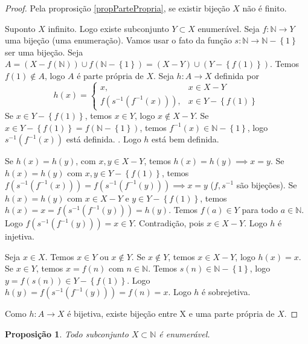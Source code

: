 \documentclass{article}
\theoremstyle{plain}
\newtheorem{prop}{Proposição}[section]
\theoremstyle{definition}
\theoremstyle{remark}
\begin{document}
\begin{proof}
	
	Pela proprosição \ref{propPartePropria}, se existir bijeção $X$ não é finito.

	Suponto $X$ infinito. Logo existe subconjunto $Y\subset X$ enumerável. Seja $f:\mathbb{N} \to Y$ uma bijeção (uma enumeração). Vamos usar o fato da função $s: \mathbb{N} \to \mathbb{N} -\left\{1\right\}$ ser uma bijeção.  Seja $A = \left(X- f\left(\mathbb{N}\right)\right) \cup f(\mathbb{N} - \left\{1\right\}) = (X - Y) \cup (Y - \left\{f(1)\right\}) $. Temos $f(1) \not \in A$, logo $A$ é parte própria de $X$. Seja $h: A \to X$ definida por $$ h(x) = \begin{cases} x, & x\in X-Y\\
	f(s^{-1}(f^{-1}(x))), & x\in Y - \left\{f(1)\right\} \end{cases}$$
	Se $x\in Y-\left\{f(1)\right\}$, temos $x\in Y$, logo $x\not \in X- Y$. Se $x\in Y - \left\{f(1) \right\} = f(\mathbb{N} - \left\{1\right\})$, temos $f^{-1}(x) \in \mathbb{N} - \left\{ 1\right\}$, logo $s^{-1}(f^{-1}(x))$ está definida.  . Logo $h$ está bem definida.

	 Se $h(x) = h(y)$, com $x,y \in X - Y$, temos $h(x) = h(y) \implies x = y$. Se $h(x) = h(y) $ com $x,y \in Y-\left\{f(1) \right\}$, temos $f(s^{-1}(f^{-1}(x))) = f(s^{-1}(f^{-1}(y))) \implies  x = y$ ($f,s^{-1}$ são bijeções).  Se $h(x) = h(y)$ com $x\in X-Y$ e $y\in Y- \left\{f(1)\right\}$, temos $h(x) = x = f(s^{-1}(f^{-1}(y))) = h(y)$. Temos $f(a) \in Y$ para todo $a\in \mathbb{N}$. Logo  $ f(s^{-1}(f^{-1}(y))) = x \in Y $. Contradição, pois $x\in X - Y$. Logo $h$ é injetiva.


	 Seja $x\in X$. Temos $x\in Y$ ou $x\not \in Y$. Se $x\not \in Y$, temos $x \in X-Y$, logo $h(x) = x$. Se $x\in Y$, temos  $x = f(n)$ com $n\in \mathbb{N}$. Temos $s(n) \in \mathbb{N} - \left\{1\right\}$, logo $ y = f(s(n)) \in Y - \left\{f(1) \right\}$. Logo $h(y) = f(s^{-1}(f^{-1}(y))) = f(n) = x$. Logo $h$ é sobrejetiva.
	 
	 Como $h:A \to X$ é bijetiva, existe bijeção entre X e uma parte própria de $X$.
\end{proof}
\begin{prop}
	Todo subconjunto $X\subset\mathbb{N}$ é enumerável.
\end{prop}
\end{document}

